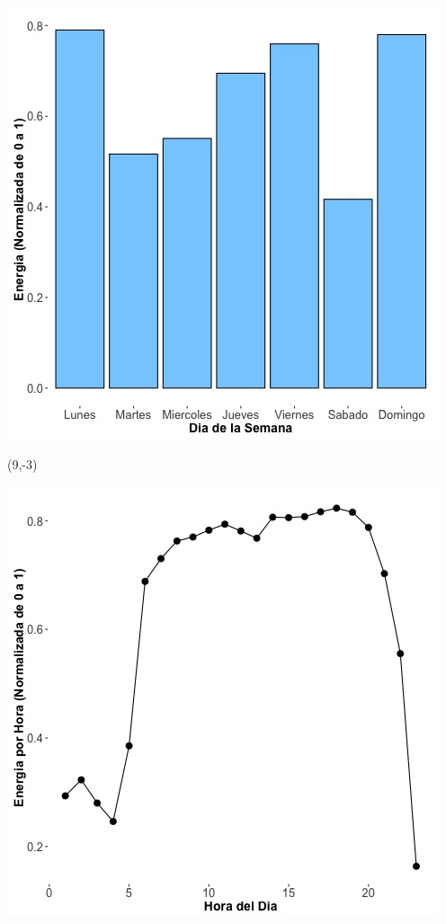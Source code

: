 \documentclass{article}\usepackage[]{graphicx}\usepackage[]{color}
\newenvironment{knitrout}{}{} %
\begin{document}
\begin{knitrout}
\color{fgcolor}
\includegraphics[scale=0.65]{figure/A26_day_of_week_plot} 
\end{knitrout}


 \begin{textblock}{1}(9,-3)
\begin{minipage}{20em}
\begingroup

\endgroup
\end{minipage}
\end{textblock}

 \vspace{2cm}

\begin{knitrout}
\color{fgcolor}
\includegraphics[scale=0.75]{figure/A26_fplot_norm_median} 
\end{knitrout}
\end{document}
